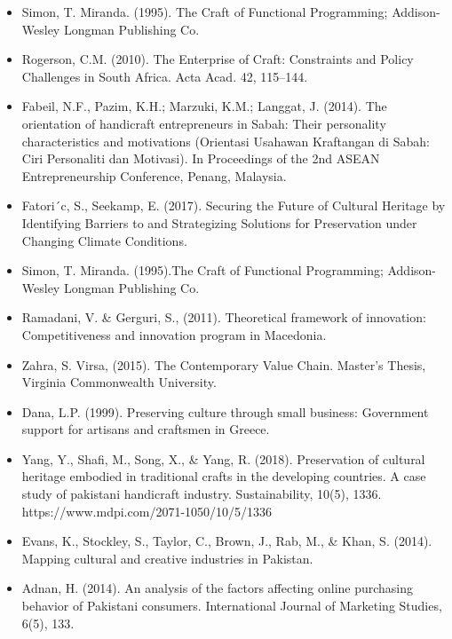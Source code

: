 \begin{itemize}
\item Simon, T. Miranda. (1995). The Craft of Functional Programming; Addison-Wesley Longman Publishing Co.

\item Rogerson, C.M. (2010). The Enterprise of Craft: Constraints and Policy Challenges in South Africa. Acta Acad. 42, 115–144.

\item Fabeil, N.F., Pazim, K.H.; Marzuki, K.M.; Langgat, J. (2014). The orientation of handicraft entrepreneurs in Sabah: Their personality characteristics and motivations (Orientasi Usahawan Kraftangan di Sabah: Ciri Personaliti dan Motivasi). In Proceedings of the 2nd ASEAN Entrepreneurship Conference, Penang, Malaysia.

\item Fatori´c, S., Seekamp, E. (2017). Securing the Future of Cultural Heritage by Identifying Barriers to and Strategizing Solutions for Preservation under Changing Climate Conditions. 

\item Simon, T. Miranda. (1995).The Craft of Functional Programming; Addison-Wesley Longman Publishing Co.

\item Ramadani, V. \& Gerguri, S., (2011).  Theoretical framework of innovation: Competitiveness and innovation program in Macedonia.

\item Zahra, S. Virsa, (2015). The Contemporary Value Chain. Master’s Thesis, Virginia Commonwealth University.

\item Dana, L.P. (1999). Preserving culture through small business: Government support for artisans and craftsmen in Greece. 

\item Yang, Y., Shafi, M., Song, X., \& Yang, R. (2018). Preservation of cultural heritage embodied in traditional crafts in the developing countries. A case study of pakistani handicraft industry. Sustainability, 10(5), 1336. https://www.mdpi.com/2071-1050/10/5/1336

\item Evans, K., Stockley, S., Taylor, C., Brown, J., Rab, M., \& Khan, S. (2014). Mapping cultural and creative industries in Pakistan. 

\item Adnan, H. (2014). An analysis of the factors affecting online purchasing behavior of Pakistani consumers. International Journal of Marketing Studies, 6(5), 133.


\end{itemize}
